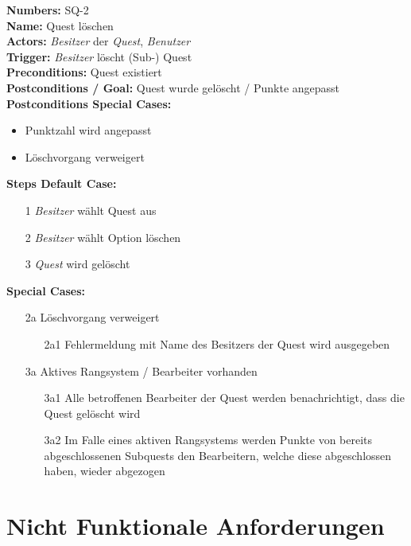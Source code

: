 \documentclass{article}
\begin{document}
\begin{samepage}
	\textbf{Numbers:} SQ-2\\
	\textbf{Name:} Quest löschen\\
	\textbf{Actors:} \textit{Besitzer} der \textit{Quest}, \textit{Benutzer}\\
	\textbf{Trigger:} \textit{Besitzer} löscht (Sub-) Quest\\ 
	\textbf{Preconditions:} Quest existiert \\ 
	\textbf{Postconditions / Goal:} Quest wurde gelöscht / Punkte angepasst\\
	\textbf{Postconditions Special Cases:} 
	\begin{itemize}
		\item Punktzahl wird angepasst 
		\item Löschvorgang verweigert
	\end{itemize}
	\textbf{Steps Default Case:}
	\begin{itemize}
		\item[1] \textit{Besitzer} wählt Quest aus
		\item[2] \textit{Besitzer} wählt Option löschen
		\item[3] \textit{Quest} wird gelöscht 
	\end{itemize}
	\textbf{Special Cases:}
	\begin{itemize}
	\item [2a] Löschvorgang verweigert
	\begin{itemize}
		\item [2a1] Fehlermeldung mit Name des Besitzers der Quest wird ausgegeben 
	\end{itemize} 
	\item [3a] Aktives Rangsystem / Bearbeiter vorhanden
	\begin{itemize}
		\item [3a1] Alle betroffenen Bearbeiter der Quest werden benachrichtigt, dass die Quest gelöscht wird
		\item [3a2] Im Falle eines aktiven Rangsystems werden Punkte von bereits abgeschlossenen Subquests den Bearbeitern, welche diese abgeschlossen haben, wieder abgezogen
	\end{itemize}
	\end{itemize}
	\end{samepage}

\newpage
\section{Nicht Funktionale Anforderungen}
\end{document}
